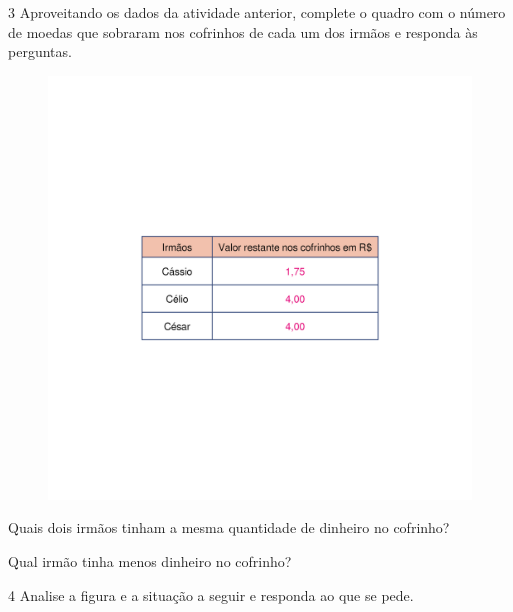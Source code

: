 
\num{3} Aproveitando os dados da atividade anterior, complete o quadro com o número de moedas que sobraram nos cofrinhos de cada um dos irmãos e responda às perguntas.

\begin{figure}[htpb!]
\centering
\includegraphics[width=.6\textwidth]{./media/image77_prof.png}
\end{figure}

\begin{escolha}[itemsep=-5pt]
\item Quais dois irmãos tinham a mesma quantidade de dinheiro no cofrinho?

\item Qual irmão tinha menos dinheiro no cofrinho?
\end{escolha}

\num{4} Analise a figura e a situação a seguir e responda ao que se pede.




